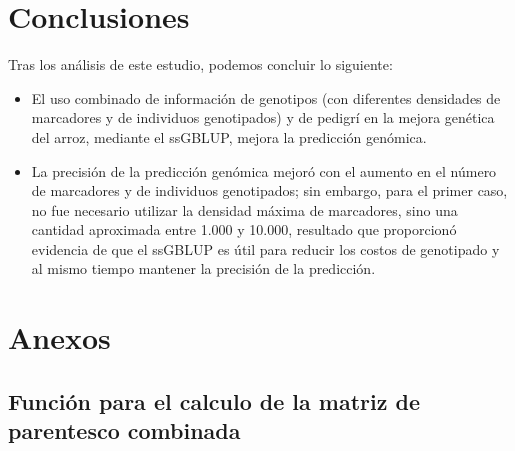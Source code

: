 \documentclass[11pt,spanish,a4paper,oneside,]{book} %
\begin{document}
\hypertarget{conclusiones}{%
\chapter{Conclusiones}\label{conclusiones}}

Tras los análisis de este estudio, podemos concluir lo siguiente:

\begin{itemize}
\item
  El uso combinado de información de genotipos (con diferentes densidades de marcadores y de individuos genotipados) y de pedigrí en la mejora genética del arroz, mediante el ssGBLUP, mejora la predicción genómica.
\item
  La precisión de la predicción genómica mejoró con el aumento en el número de marcadores y de individuos genotipados; sin embargo, para el primer caso, no fue necesario utilizar la densidad máxima de marcadores, sino una cantidad aproximada entre 1.000 y 10.000, resultado que proporcionó evidencia de que el ssGBLUP es útil para reducir los costos de genotipado y al mismo tiempo mantener la precisión de la predicción.
\end{itemize}

\clearpage\null\thispagestyle{empty}

\hypertarget{appendix-appendix}{%
\appendix}


\hypertarget{anexos}{%
\chapter{Anexos}\label{anexos}}

\hypertarget{funciuxf3n-para-el-calculo-de-la-matriz-de-parentesco-combinada}{%
\section{Función para el calculo de la matriz de parentesco combinada}\label{funciuxf3n-para-el-calculo-de-la-matriz-de-parentesco-combinada}}
\end{document}
